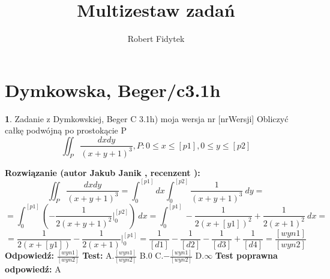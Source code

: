 \documentclass[12pt, a4paper]{article}
\title{Multizestaw zadań}
\author{Robert Fidytek}
\date{}
\theoremstyle{definition} %
\newtheorem{zad}{}
\newcommand{\kategoria}[1]{\section{#1}} %
\newcommand{\zadStart}[1]{\begin{zad}#1\newline} %
\newcommand{\zadStop}{\end{zad}}   %
\newcommand{\rozwStart}[2]{\noindent \textbf{Rozwiązanie (autor #1 , recenzent #2): }\newline} %
\newcommand{\rozwStop}{\newline}                                            %
\newcommand{\odpStart}{\noindent \textbf{Odpowiedź:}\newline}    %
\newcommand{\odpStop}{\newline}                                             %
\newcommand{\testStart}{\noindent \textbf{Test:}\newline} %
\newcommand{\testStop}{\newline} %
\newcommand{\kluczStart}{\noindent \textbf{Test poprawna odpowiedź:}\newline} %
\newcommand{\kluczStop}{\newline} %
\begin{document}
\maketitle


\kategoria{Dymkowska, Beger/c3.1h}
\zadStart{Zadanie z Dymkowskiej, Beger C 3.1h) moja wersja nr [nrWersji]}
Obliczyć całkę podwójną po prostokącie P $$\iint_P \frac{dxdy}{(x+y+1)^3}, P: 0\leq x \leq [p1], 0 \leq y \leq [p2]$$
\zadStop
\rozwStart{Jakub Janik}{}
$$\iint_P \frac{dxdy}{(x+y+1)^3}=\int_0^{[p1]}dx\int_0^{[p2]} \frac{1}{(x+y+1)^3}\ dy=$$
$$=\int_0^{[p1]} (-\frac{1}{2(x+y+1)^2}\Big|_0^{[p2]})\ dx=\int_0^{[p1]}-\frac{1}{2(x+[y1])^2}+\frac{1}{2(x+1)^2}\ dx=$$
$$=\frac{1}{2(x+[y1])}-\frac{1}{2(x+1)}\Big|_0^{[p1]}=\frac{1}{[d1]}-\frac{1}{[d2]}-\frac{1}{[d3]}+\frac{1}{[d4]}=\frac{[wyn1]}{[wyn2]}$$
\rozwStop
\odpStart
$\frac{[wyn1]}{[wyn2]}$
\odpStop
\testStart
A.$\frac{[wyn1]}{[wyn2]}$
B.$0$
C.$-\frac{[wyn1]}{[wyn2]}$
D.$\infty$
\testStop
\kluczStart
A
\kluczStop
\end{document}
